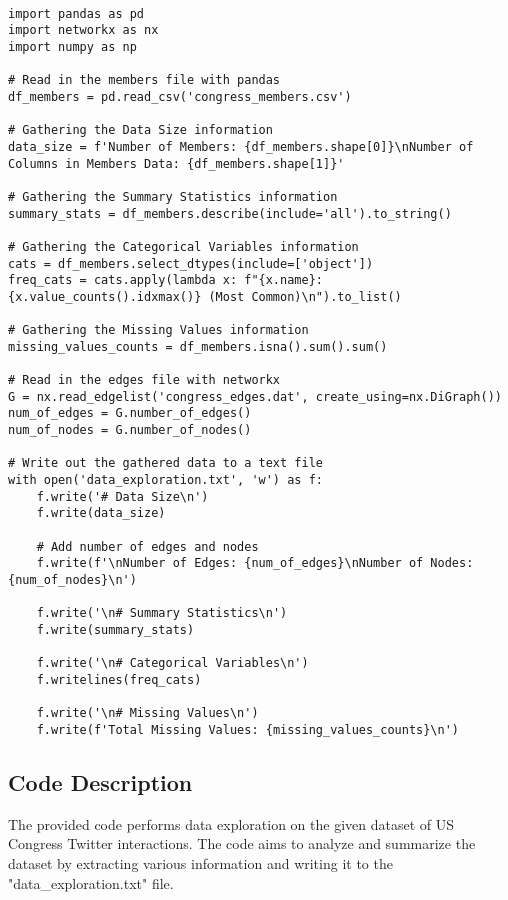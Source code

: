 \documentclass[11pt]{article}
\begin{document}
\begin{verbatim}

import pandas as pd
import networkx as nx
import numpy as np

# Read in the members file with pandas
df_members = pd.read_csv('congress_members.csv')

# Gathering the Data Size information
data_size = f'Number of Members: {df_members.shape[0]}\nNumber of Columns in Members Data: {df_members.shape[1]}'

# Gathering the Summary Statistics information
summary_stats = df_members.describe(include='all').to_string()

# Gathering the Categorical Variables information
cats = df_members.select_dtypes(include=['object'])
freq_cats = cats.apply(lambda x: f"{x.name}: {x.value_counts().idxmax()} (Most Common)\n").to_list()

# Gathering the Missing Values information
missing_values_counts = df_members.isna().sum().sum()

# Read in the edges file with networkx
G = nx.read_edgelist('congress_edges.dat', create_using=nx.DiGraph())
num_of_edges = G.number_of_edges()
num_of_nodes = G.number_of_nodes()

# Write out the gathered data to a text file
with open('data_exploration.txt', 'w') as f:
    f.write('# Data Size\n')
    f.write(data_size)

    # Add number of edges and nodes
    f.write(f'\nNumber of Edges: {num_of_edges}\nNumber of Nodes: {num_of_nodes}\n')

    f.write('\n# Summary Statistics\n')
    f.write(summary_stats)

    f.write('\n# Categorical Variables\n')
    f.writelines(freq_cats)

    f.write('\n# Missing Values\n')
    f.write(f'Total Missing Values: {missing_values_counts}\n')

\end{verbatim}

\subsection{Code Description}

The provided code performs data exploration on the given dataset of US Congress Twitter interactions. The code aims to analyze and summarize the dataset by extracting various information and writing it to the "data\_exploration.txt" file.
\end{document}
